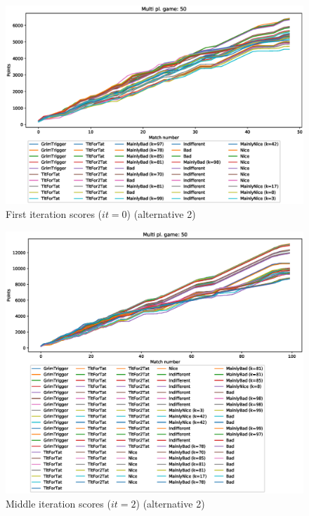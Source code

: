 \documentclass[journal,10pt,twoside]{IEEEtran}
\begin{document}
\begin{figure}[!ht]
    \centering
    \includegraphics[width=1\columnwidth]{../img/ripdmp-incr/alt2/ripdmp-scores-increasing-pop-50-r0}
    \caption{First iteration scores ($it=0$) (alternative 2)}
    \label{fig:incrFIa2}
\end{figure}

\begin{figure}[!ht]
    \centering
    \includegraphics[width=1\columnwidth]{../img/ripdmp-incr/alt2/ripdmp-scores-increasing-pop-50-r2}
    \caption{Middle iteration scores ($it=2$) (alternative 2)}
    \label{fig:incrMIa2}
\end{figure}
\end{document}
